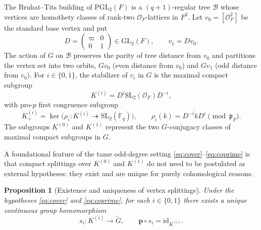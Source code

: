 \documentclass[12pt, letterpaper]{article}
\numberwithin{equation}{section}
\newtheorem{proposition}[theorem]{Proposition}
\theoremstyle{definition}
\theoremstyle{remark}
\newcommand{\OO}{\mathcal{O}_F}
\newcommand{\kk}{\mathbb{F}_q}
\newcommand{\Gbar}{\mathrm{SL}_2(\kk)}
\newcommand{\wtG}{\widetilde{G}}
\begin{document}
The Bruhat--Tits building of $\mathrm{PGL}_2(F)$ is a $(q+1)$-regular tree $\mathscr{B}$ whose vertices are homothety classes of rank-two $\OO$-lattices in $F^2$. Let $v_0=[\OO^2]$ be the standard base vertex and put
\begin{equation}\label{eq:D-def}
 D=\begin{pmatrix}\varpi&0\\0&1\end{pmatrix}\in\mathrm{GL}_2(F),\qquad v_1=Dv_0.
\end{equation}
The action of $G$ on $\mathscr{B}$ preserves the parity of tree distance from $v_0$ and partitions the vertex set into two orbits, $Gv_0$ (even distance from $v_0$) and $Gv_1$ (odd distance from $v_0$). For $i\in\{0,1\}$, the stabilizer of $v_i$ in $G$ is the maximal compact subgroup
\begin{equation}\label{eq:Ki-def}
 K^{(i)}=D^i\mathrm{SL}_2(\OO)D^{-i},
\end{equation}
with pro-$p$ first congruence subgroup
\begin{equation}\label{eq:Ki-plus}
 K^{(i)}_+=\ker\bigl(\rho_i:K^{(i)}\twoheadrightarrow\Gbar\bigr),\qquad
 \rho_i(k)=\overline{D^{-i}kD^i}\pmod{\mathfrak{p}_F}.
\end{equation}
The subgroups $K^{(0)}$ and $K^{(1)}$ represent the two $G$-conjugacy classes of maximal compact subgroups in $G$.

A foundational feature of the tame odd-degree setting \eqref{eq:cover}--\eqref{eq:coprime} is that compact splittings over $K^{(0)}$ and $K^{(1)}$ do not need to be postulated as external hypotheses: they exist and are unique for purely cohomological reasons.

\begin{proposition}[Existence and uniqueness of vertex splittings]\label{prop:unique-splittings}
Under the hypotheses \eqref{eq:cover} and \eqref{eq:coprime}, for each $i\in\{0,1\}$ there exists a unique continuous group homomorphism
\begin{equation}\label{eq:si-def}
 s_i:K^{(i)}\longrightarrow\wtG,\qquad \mathbf{p}\circ s_i=\mathrm{id}_{K^{(i)}}.
\end{equation}
\end{proposition}
\end{document}
